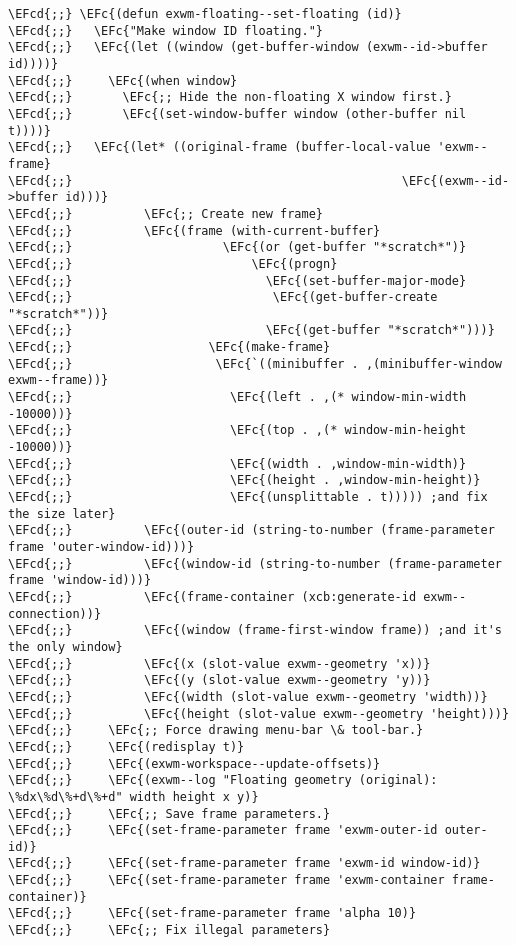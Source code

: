 \documentclass[a4wide,10pt]{article}
\newcommand{\EFc}[1]{\textcolor{EFc}{#1}} %
\newcommand{\EFcd}[1]{\textcolor{EFcd}{#1}} %
\begin{document}
\begin{Code}
\begin{Verbatim}
\EFcd{;;} \EFc{(defun exwm-floating--set-floating (id)}
\EFcd{;;}   \EFc{"Make window ID floating."}
\EFcd{;;}   \EFc{(let ((window (get-buffer-window (exwm--id->buffer id))))}
\EFcd{;;}     \EFc{(when window}
\EFcd{;;}       \EFc{;; Hide the non-floating X window first.}
\EFcd{;;}       \EFc{(set-window-buffer window (other-buffer nil t))))}
\EFcd{;;}   \EFc{(let* ((original-frame (buffer-local-value 'exwm--frame}
\EFcd{;;}                                              \EFc{(exwm--id->buffer id)))}
\EFcd{;;}          \EFc{;; Create new frame}
\EFcd{;;}          \EFc{(frame (with-current-buffer}
\EFcd{;;}                     \EFc{(or (get-buffer "*scratch*")}
\EFcd{;;}                         \EFc{(progn}
\EFcd{;;}                           \EFc{(set-buffer-major-mode}
\EFcd{;;}                            \EFc{(get-buffer-create "*scratch*"))}
\EFcd{;;}                           \EFc{(get-buffer "*scratch*")))}
\EFcd{;;}                   \EFc{(make-frame}
\EFcd{;;}                    \EFc{`((minibuffer . ,(minibuffer-window exwm--frame))}
\EFcd{;;}                      \EFc{(left . ,(* window-min-width -10000))}
\EFcd{;;}                      \EFc{(top . ,(* window-min-height -10000))}
\EFcd{;;}                      \EFc{(width . ,window-min-width)}
\EFcd{;;}                      \EFc{(height . ,window-min-height)}
\EFcd{;;}                      \EFc{(unsplittable . t))))) ;and fix the size later}
\EFcd{;;}          \EFc{(outer-id (string-to-number (frame-parameter frame 'outer-window-id)))}
\EFcd{;;}          \EFc{(window-id (string-to-number (frame-parameter frame 'window-id)))}
\EFcd{;;}          \EFc{(frame-container (xcb:generate-id exwm--connection))}
\EFcd{;;}          \EFc{(window (frame-first-window frame)) ;and it's the only window}
\EFcd{;;}          \EFc{(x (slot-value exwm--geometry 'x))}
\EFcd{;;}          \EFc{(y (slot-value exwm--geometry 'y))}
\EFcd{;;}          \EFc{(width (slot-value exwm--geometry 'width))}
\EFcd{;;}          \EFc{(height (slot-value exwm--geometry 'height)))}
\EFcd{;;}     \EFc{;; Force drawing menu-bar \& tool-bar.}
\EFcd{;;}     \EFc{(redisplay t)}
\EFcd{;;}     \EFc{(exwm-workspace--update-offsets)}
\EFcd{;;}     \EFc{(exwm--log "Floating geometry (original): \%dx\%d\%+d\%+d" width height x y)}
\EFcd{;;}     \EFc{;; Save frame parameters.}
\EFcd{;;}     \EFc{(set-frame-parameter frame 'exwm-outer-id outer-id)}
\EFcd{;;}     \EFc{(set-frame-parameter frame 'exwm-id window-id)}
\EFcd{;;}     \EFc{(set-frame-parameter frame 'exwm-container frame-container)}
\EFcd{;;}     \EFc{(set-frame-parameter frame 'alpha 10)}
\EFcd{;;}     \EFc{;; Fix illegal parameters}

\end{Verbatim}
\end{Code}
\end{document}
